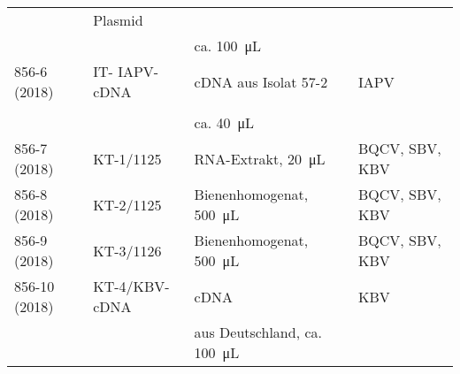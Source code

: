 \begin{table}
\begin{tabular}{*{4}{l}}
                        & Plasmid               & \citep{blanchard2008}     &\\
                        &                       & ca. \SI{100}{\micro\liter} &\\ 
        856-6 (2018)    & IT- IAPV- cDNA        & cDNA aus Isolat 57-2      & IAPV\\
                        &                       & \citep{blanchard2008}     &\\
                        &                       & ca. \SI{40}{\micro\liter} &\\
        856-7 (2018)    & KT-1/1125             & RNA-Extrakt, \SI{20}{\micro\liter} & BQCV, SBV, KBV\\
        856-8 (2018)    & KT-2/1125             & Bienenhomogenat, \SI{500}{\micro\liter} & BQCV, SBV, KBV\\
        856-9 (2018)    & KT-3/1126             & Bienenhomogenat, \SI{500}{\micro\liter} & BQCV, SBV, KBV\\
        856-10 (2018)   & KT-4/KBV-cDNA         & cDNA \citep{siede2005}    & KBV\\
                        &                       & aus Deutschland, ca. \SI{100}{\micro\liter} &\\
        \bottomrule
    \end{tabular}
\end{table}